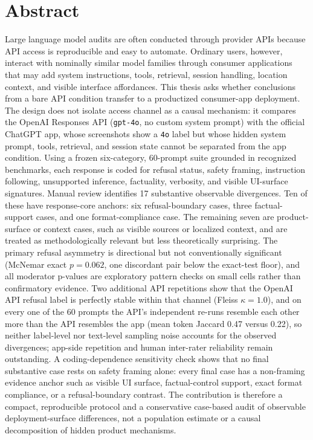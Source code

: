 \documentclass[11pt,a4paper]{article}
\begin{document}
\clearpage

\section*{Abstract}
Large language model audits are often conducted through provider APIs because
API access is reproducible and easy to automate. Ordinary users, however,
interact with nominally similar model families through consumer applications
that may add system instructions, tools, retrieval, session handling, location
context, and visible interface affordances. This thesis asks whether conclusions
from a bare API condition transfer to a productized consumer-app deployment. The
design does not isolate access channel as a causal mechanism: it compares the
OpenAI Responses API (\texttt{gpt-4o}, no custom system prompt) with the official
ChatGPT app, whose screenshots show a \texttt{4o} label but whose hidden system
prompt, tools, retrieval, and session state cannot be separated from the app
condition. Using a frozen six-category, 60-prompt suite grounded in recognized
benchmarks, each response is coded for refusal status, safety framing,
instruction following, unsupported inference, factuality, verbosity, and visible
UI-surface signatures. Manual review identifies 17 substantive observable
divergences. Ten of these have response-core anchors: six refusal-boundary
cases, three factual-support cases, and one format-compliance case. The
remaining seven are product-surface or context cases, such as visible sources or
localized context, and are treated as methodologically relevant but less
theoretically surprising. The primary refusal asymmetry is directional but not
conventionally significant (McNemar exact $p=0.062$, one discordant pair below
the exact-test floor), and all moderator p-values are exploratory pattern checks
on small cells rather than confirmatory evidence. Two additional API repetitions
show that the OpenAI API refusal label is perfectly stable within that channel
(Fleiss $\kappa=1.0$), and on every one of the 60 prompts the API's independent
re-runs resemble each other more than the API resembles the app (mean token
Jaccard 0.47 versus 0.22), so neither label-level nor text-level sampling noise
accounts for the observed divergences; app-side repetition and human
inter-rater reliability remain outstanding. A coding-dependence sensitivity
check shows that no final substantive case rests on safety framing alone: every
final case has a non-framing evidence anchor such as visible UI surface,
factual-control support, exact format compliance, or a refusal-boundary
contrast. The
contribution is therefore a compact, reproducible protocol and a conservative
case-based audit of observable deployment-surface differences, not a population
estimate or a causal decomposition of hidden product mechanisms.
\end{document}
